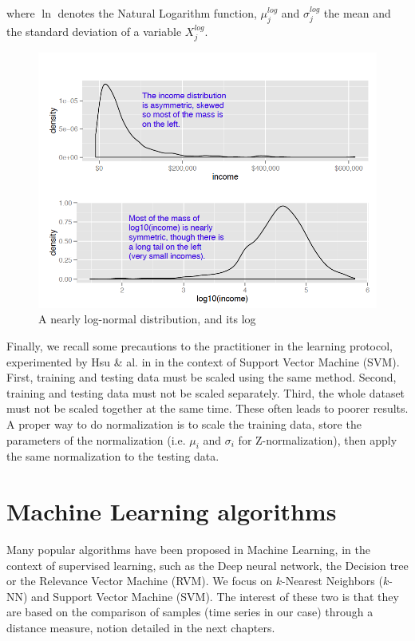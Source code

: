\noindent where $\ln$ denotes the Natural Logarithm function, $\mu^{log}_j$ and $\sigma^{log}_j$ the mean and the standard deviation of a variable $X^{log}_j$.

\begin{figure}
	\centering
	\includegraphics[width=0.6\linewidth]{images/SkewedData}
	\caption{A nearly log-normal distribution, and its log \protect\footnotemark}
	\label{fig:SkewedData}
\end{figure}

Finally, we recall some precautions to the practitioner in the learning protocol, experimented by Hsu \& al. in \cite{Hsu2008} in the context of Support Vector Machine (SVM). First, training and testing data must be scaled using the same method. Second, training and testing data must not be scaled separately. Third, the whole dataset must not be scaled together at the same time. These often leads to poorer results. A proper way to do normalization is to scale the training data, store the parameters of the normalization (i.e. $\mu_i$ and $\sigma_i$ for Z-normalization), then apply the same normalization to the testing data. 


\section{Machine Learning algorithms}

Many popular algorithms have been proposed in Machine Learning, in the context of supervised learning, such as the Deep neural network, the Decision tree or the Relevance Vector Machine (RVM). We focus on $k$-Nearest Neighbors ($k$-NN) and Support Vector Machine (SVM). The interest of these two is that they are based on the comparison of samples (time series in our case) through a distance measure, notion detailed in the next chapters.  

